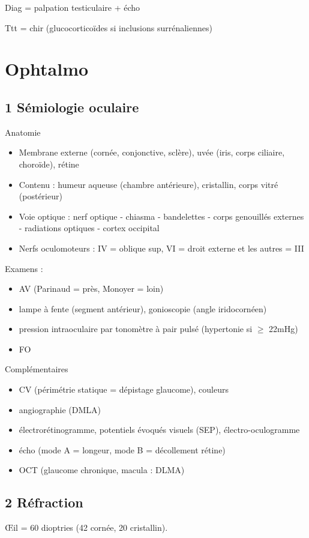 \documentclass[11pt]{article}
\begin{document}
Diag = palpation testiculaire + écho

Ttt = chir (glucocorticoïdes si inclusions surrénaliennes)

\section{Ophtalmo}
\label{sec:org2cdabec}
\subsection{1 Sémiologie oculaire}
\label{sec:orgbffb102}
Anatomie 
\begin{itemize}
\item Membrane externe (cornée, conjonctive, sclère), uvée (iris, corps ciliaire,
choroïde), rétine
\item Contenu : humeur aqueuse (chambre antérieure), cristallin, corps vitré
(postérieur)
\item Voie optique : nerf optique - chiasma - bandelettes - corps genouillés
externes - radiations optiques - cortex occipital
\item Nerfs oculomoteurs : IV = oblique sup, VI = droit externe et les autres = III
\end{itemize}
Examens :
\begin{itemize}
\item AV (Parinaud = près, Monoyer = loin)
\item lampe à fente (segment antérieur), gonioscopie (angle iridocornéen)
\item pression intraoculaire par tonomètre à pair pulsé (hypertonie si \(\ge\) 22mHg)
\item FO
\end{itemize}
Complémentaires
\begin{itemize}
\item CV (périmétrie statique = dépistage glaucome), couleurs
\item angiographie (DMLA)
\item électrorétinogramme, potentiels évoqués visuels (SEP), électro-oculogramme
\item écho (mode A = longeur, mode B = décollement rétine)
\item OCT (glaucome chronique, macula : DLMA)
\end{itemize}
\subsection{2 Réfraction}
\label{sec:org7b17b9a}
\OE{}il = 60 dioptries (42 cornée, 20 cristallin).
\end{document}

